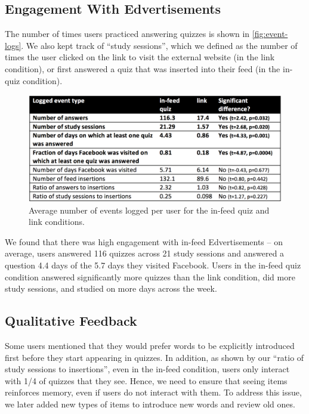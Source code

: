 \documentclass{sigchi}
\begin{document}
\subsection{Engagement With Edvertisements}

The number of times users practiced answering quizzes is shown in \autoref{fig:event-logs}. We also kept track of ``study sessions'', which we defined as the number of times the user clicked on the link to visit the external website (in the link condition), or first answered a quiz that was inserted into their feed (in the in-quiz condition). %

\begin{figure}
\centering
\includegraphics[width=1.0\columnwidth]{event-logs-feedlearn}
\caption{Average number of events logged per user for the in-feed quiz and link conditions.}
\label{fig:event-logs}
\end{figure}

We found that there was high engagement with in-feed Edvertisements -- on average, users answered 116 quizzes across 21 study sessions and answered a question 4.4 days of the 5.7 days they visited Facebook. Users in the in-feed quiz condition answered significantly more quizzes than the link condition, did more study sessions, and studied on more days across the week. %

\subsection{Qualitative Feedback}

Some users mentioned that they would prefer words to be explicitly introduced first before they start appearing in quizzes.  In addition, as shown by our ``ratio of study sessions to insertions'', even in the in-feed condition, users only interact with 1/4 of quizzes that they see. Hence, we need to ensure that seeing items reinforces memory, even if users do not interact with them. To address this issue, we later added new types of items to introduce new words and review old ones.
\end{document}
